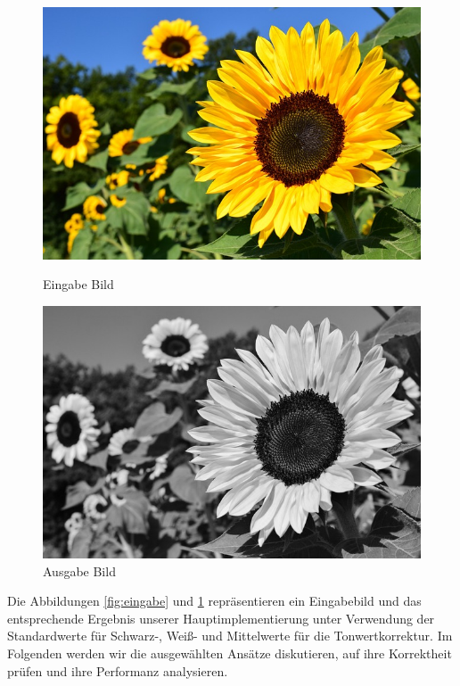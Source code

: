 \documentclass[course=erap]{aspdoc}
\begin{document}
\begin{figure}[h]
  \begin{minipage}{0.47\linewidth}
    \centering
    \includegraphics[width=\linewidth]{sunflower.png}
    \caption{Eingabe Bild}
    \label{fig:eingabe}
  \end{minipage}
  \hfill
  \begin{minipage}{0.47\linewidth}
    \centering
    \includegraphics[width=\linewidth]{SunflowerBW.png}
    \caption{Ausgabe Bild}
    \label{fig:ausgabe}
  \end{minipage}
\end{figure}

Die Abbildungen \ref{fig:eingabe} und \ref{fig:ausgabe} repräsentieren ein Eingabebild und das entsprechende Ergebnis unserer Hauptimplementierung unter Verwendung der Standardwerte für Schwarz-, Weiß- und Mittelwerte für die Tonwertkorrektur.
Im Folgenden werden wir die ausgewählten Ansätze diskutieren, auf ihre Korrektheit prüfen und ihre Performanz analysieren.
\end{document}
